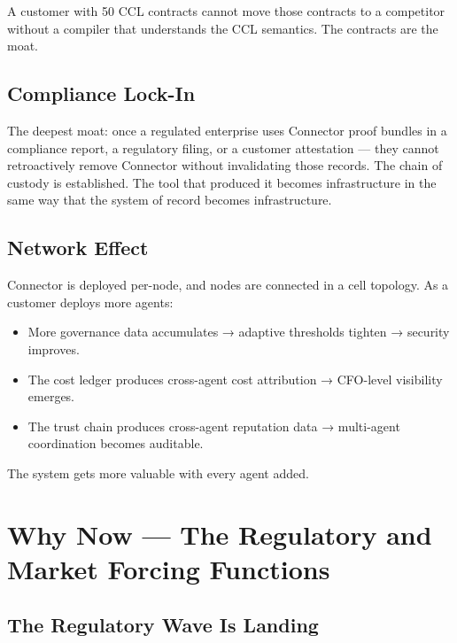 \documentclass[11pt,a4paper]{article}
\begin{document}
A customer with 50 CCL contracts cannot move those contracts to a competitor without a compiler
that understands the CCL semantics. The contracts are the moat.

\subsection{Compliance Lock-In}

The deepest moat: once a regulated enterprise uses Connector proof bundles in a compliance report,
a regulatory filing, or a customer attestation — they cannot retroactively remove Connector without
invalidating those records. The chain of custody is established. The tool that produced it
becomes infrastructure in the same way that the system of record becomes infrastructure.

\subsection{Network Effect}

Connector is deployed per-node, and nodes are connected in a cell topology. As a customer
deploys more agents:
\begin{itemize}
  \item More governance data accumulates → adaptive thresholds tighten → security improves.
  \item The cost ledger produces cross-agent cost attribution → CFO-level visibility emerges.
  \item The trust chain produces cross-agent reputation data → multi-agent coordination becomes auditable.
\end{itemize}

The system gets more valuable with every agent added.

\clearpage

\section{Why Now — The Regulatory and Market Forcing Functions}
\label{sec:why-now}

\subsection{The Regulatory Wave Is Landing}
\end{document}
